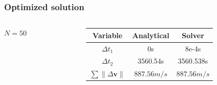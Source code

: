 \documentclass{beamer}
\begin{document}
\begin{frame}
    \frametitle{Optimized solution}
    \begin{columns}
        \begin{column}{0.3\textwidth}\centering
            \(N = 50\)
        \end{column}
        \begin{column}{0.7\textwidth}
            \begin{table}[htbp]
                \centering
                \begin{tabular}{ccc} \toprule
                    Variable & Analytical & Solver \\ \midrule
                    \(\Delta t_1\) & 0s & 8e-4s \\
                    \(\Delta t_2\) & 3560.54s & 3560.538s \\
                    \(\sum \lVert \Delta \mathbf{v} \rVert\) & \(887.56m/s\) & \(887.56m/s\) \\ \bottomrule
                \end{tabular}
                \label{tab:hohmann_results}
            \end{table}
        \end{column}
    \end{columns}
    

\end{frame}
\end{document}
